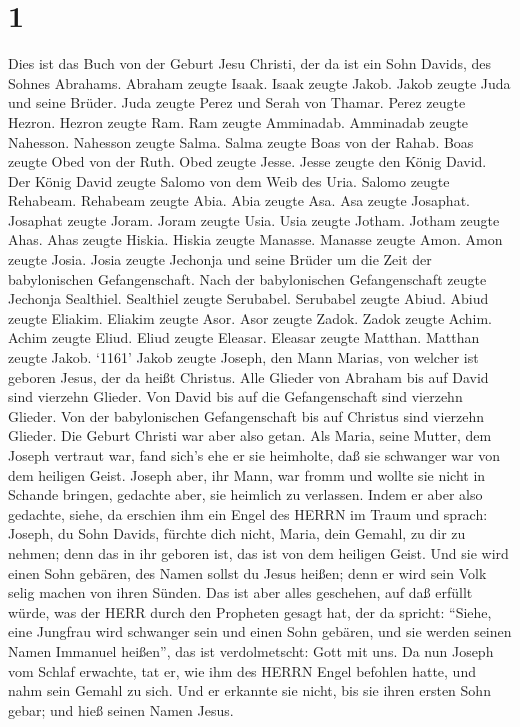 \hypertarget{section}{%
\section{1}\label{section}}

 Dies ist das Buch von der Geburt Jesu Christi, der da ist
ein Sohn Davids, des Sohnes Abrahams.  Abraham zeugte Isaak.
Isaak zeugte Jakob. Jakob zeugte Juda und seine Brüder. 
Juda zeugte Perez und Serah von Thamar. Perez zeugte Hezron. Hezron
zeugte Ram.  Ram zeugte Amminadab. Amminadab zeugte
Nahesson. Nahesson zeugte Salma.  Salma zeugte Boas von der
Rahab. Boas zeugte Obed von der Ruth. Obed zeugte Jesse. 
Jesse zeugte den König David. Der König David zeugte Salomo von dem Weib
des Uria.  Salomo zeugte Rehabeam. Rehabeam zeugte Abia.
Abia zeugte Asa.  Asa zeugte Josaphat. Josaphat zeugte
Joram. Joram zeugte Usia.  Usia zeugte Jotham. Jotham zeugte
Ahas. Ahas zeugte Hiskia.  Hiskia zeugte Manasse. Manasse
zeugte Amon. Amon zeugte Josia.  Josia zeugte Jechonja und
seine Brüder um die Zeit der babylonischen Gefangenschaft. 
Nach der babylonischen Gefangenschaft zeugte Jechonja Sealthiel.
Sealthiel zeugte Serubabel.  Serubabel zeugte Abiud. Abiud
zeugte Eliakim. Eliakim zeugte Asor.  Asor zeugte Zadok.
Zadok zeugte Achim. Achim zeugte Eliud.  Eliud zeugte
Eleasar. Eleasar zeugte Matthan. Matthan zeugte Jakob. 
`1161' Jakob zeugte Joseph, den Mann Marias, von welcher ist geboren
Jesus, der da heißt Christus.  Alle Glieder von Abraham bis
auf David sind vierzehn Glieder. Von David bis auf die Gefangenschaft
sind vierzehn Glieder. Von der babylonischen Gefangenschaft bis auf
Christus sind vierzehn Glieder.  Die Geburt Christi war
aber also getan. Als Maria, seine Mutter, dem Joseph vertraut war, fand
sich's ehe er sie heimholte, daß sie schwanger war von dem heiligen
Geist.  Joseph aber, ihr Mann, war fromm und wollte sie
nicht in Schande bringen, gedachte aber, sie heimlich zu verlassen.
 Indem er aber also gedachte, siehe, da erschien ihm ein
Engel des HERRN im Traum und sprach: Joseph, du Sohn Davids, fürchte
dich nicht, Maria, dein Gemahl, zu dir zu nehmen; denn das in ihr
geboren ist, das ist von dem heiligen Geist.  Und sie wird
einen Sohn gebären, des Namen sollst du Jesus heißen; denn er wird sein
Volk selig machen von ihren Sünden.  Das ist aber alles
geschehen, auf daß erfüllt würde, was der HERR durch den Propheten
gesagt hat, der da spricht:  ``Siehe, eine Jungfrau wird
schwanger sein und einen Sohn gebären, und sie werden seinen Namen
Immanuel heißen'', das ist verdolmetscht: Gott mit uns.  Da
nun Joseph vom Schlaf erwachte, tat er, wie ihm des HERRN Engel befohlen
hatte, und nahm sein Gemahl zu sich.  Und er erkannte sie
nicht, bis sie ihren ersten Sohn gebar; und hieß seinen Namen Jesus.

